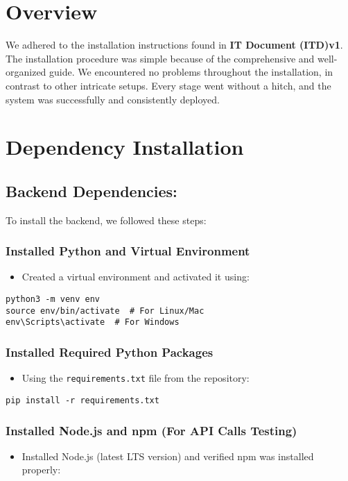 \section{Overview}
\label{sec:overview}
We adhered to the installation instructions found in \textbf{IT Document (ITD)v1}. The installation procedure was simple because of the comprehensive and well-organized guide. We encountered no problems throughout the installation, in contrast to other intricate setups. Every stage went without a hitch, and the system was successfully and consistently deployed.

\section{Dependency Installation}
\subsection{Backend Dependencies:}
To install the backend, we followed these steps:

\subsubsection{Installed Python and Virtual Environment}
\begin{itemize}
    \item Created a virtual environment and activated it using:
\end{itemize}


\begin{verbatim}
python3 -m venv env
source env/bin/activate  # For Linux/Mac  
env\Scripts\activate  # For Windows  
\end{verbatim}

\subsubsection{Installed Required Python Packages}
\begin{itemize}
    \item Using the \texttt{requirements.txt} file from the repository:
\end{itemize}

\begin{verbatim}
pip install -r requirements.txt
\end{verbatim}

\subsubsection{Installed Node.js and npm (For API Calls Testing)}
\begin{itemize}
    \item Installed Node.js (latest LTS version) and verified npm was installed properly:
\end{itemize}

